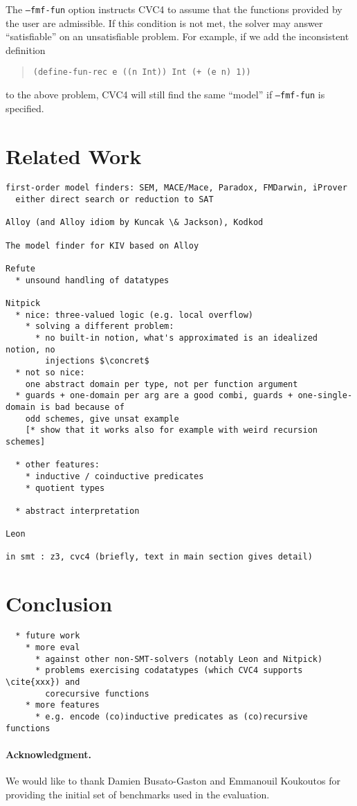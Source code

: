 \documentclass[runningheads,a4paper]{llncs}
\newcommand\concret{\gamma} %
\begin{document}
The \texttt{--fmf-fun} option instructs CVC4 to assume that the
functions provided by the user are admissible.
If this condition is not met, the solver may answer ``satisfiable'' on
an unsatisfiable problem. For example, if we add the inconsistent definition
%
\begin{quote}
\begin{verbatim}
(define-fun-rec e ((n Int)) Int (+ (e n) 1))
\end{verbatim}
\end{quote}
%
to the above problem, CVC4 will still find the same ``model''
if \texttt{--fmf-fun} is specified.

\section{Related Work}

\begin{verbatim}
first-order model finders: SEM, MACE/Mace, Paradox, FMDarwin, iProver
  either direct search or reduction to SAT

Alloy (and Alloy idiom by Kuncak \& Jackson), Kodkod

The model finder for KIV based on Alloy

Refute
  * unsound handling of datatypes

Nitpick
  * nice: three-valued logic (e.g. local overflow)
    * solving a different problem:
      * no built-in notion, what's approximated is an idealized notion, no
        injections $\concret$
  * not so nice:
    one abstract domain per type, not per function argument
  * guards + one-domain per arg are a good combi, guards + one-single-domain is bad because of
    odd schemes, give unsat example
    [* show that it works also for example with weird recursion schemes]

  * other features:
    * inductive / coinductive predicates
    * quotient types

  * abstract interpretation

Leon

in smt : z3, cvc4 (briefly, text in main section gives detail)
\end{verbatim}

\section{Conclusion}
\label{sec:conclusion}

\begin{verbatim}
  * future work
    * more eval
      * against other non-SMT-solvers (notably Leon and Nitpick)
      * problems exercising codatatypes (which CVC4 supports \cite{xxx}) and
        corecursive functions
    * more features
      * e.g. encode (co)inductive predicates as (co)recursive functions
\end{verbatim}

{%
\def\ackname{Acknowledgment}
\paragraph{%
\ackname.}
We would like to thank Damien Busato-Gaston and Emmanouil Koukoutos for
providing the initial set of benchmarks used in the evaluation.
}



{


}
\end{document}
